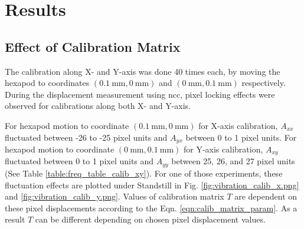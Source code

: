\chapter{Results} \label{chapter:results}



\section{Effect of Calibration Matrix} \label{section:results_discussion_calib}
    The calibration along X- and Y-axis was done 40 times each, by moving the hexapod to coordinates $(\SI{0.1}{\milli\meter}, \SI{0}{\milli\meter})$ and $(\SI{0}{\milli\meter}, \SI{0.1}{\milli\meter})$ respectively. During the displacement measurement using \gls{ncc}, pixel locking\cite{raffel} effects were observed for calibrations along both X- and Y-axis. 
    
    \vspace{5mm}
    \noindent For hexapod motion to coordinate $(\SI{0.1}{\milli\meter}, \SI{0}{\milli\meter})$ for X-axis calibration, $A_{xx}$ fluctuated between -26 to -25 pixel units and $A_{yx}$ between 0 to 1 pixel units. For hexapod motion to coordinate $(\SI{0}{\milli\meter}, \SI{0.1}{\milli\meter})$ for Y-axis calibration, $A_{xy}$ fluctuated between 0 to 1 pixel units and $A_{yy}$ between 25, 26, and 27 pixel units (See Table \ref{table:freq_table_calib_xy}). For one of those experiments, these fluctuation effects are plotted under \textsf{Standstill} in Fig. \ref{fig:vibration_calib_x.png} and \ref{fig:vibration_calib_y.png}. Values of calibration matrix $T$ are dependent on these pixel displacements according to the Eqn. \ref{eqn:calib_matrix_param}. As a result $T$ can be different depending on chosen pixel displacement values.

